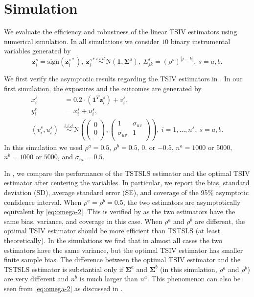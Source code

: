 \documentclass[preprint]{imsart}
\begin{document}
\section{Simulation}
\label{sec:simulation}

We evaluate the efficiency and robustness of the linear TSIV
estimators using numerical simulation. In all simulations we consider
$10$ binary instrumental variables generated by
\begin{equation} \label{eq:sim-iv}
  \mathbf{z}_i^s = \mathrm{sign}(\mathbf{z}_i^{s*}),~\mathbf{z}_i^{s*}
  \overset{i.i.d.}{\sim} \mathrm{N}(\mathbf{1},
  \bm{\Sigma}^s),~\Sigma_{jk}^s = (\rho^s)^{|j-k|},~s=a,b.
\end{equation}

We first verify the asymptotic results regarding the TSIV estimators in
. In our first simulation, the exposures
and the outcomes
are generated by
\begin{align}
  x_i^s &= 0.2 \cdot (\mathbf{1}^T \mathbf{z}_i^s) +
  v_i^s, \label{eq:sim1-exposure} \\
  y_i^s &= x_i^s + u_i^s, \label{eq:sim1-outcome}\\
  (v_i^s,u_i^s) &\overset{i.i.d.}{\sim} \mathrm{N}\left(
    \begin{pmatrix}
      0 \\
      0 \\
    \end{pmatrix},
    \begin{pmatrix}
      1 & \sigma_{uv} \\
      \sigma_{uv} & 1 \\
    \end{pmatrix}
  \right),~i=1,\dotsc,n^s,~s=a,b. \label{eq:sim1-uv}
\end{align}
In this simulation we used $\rho^a = 0.5$, $\rho^b = 0.5$, $0$, or
$-0.5$, $n^a=1000$ or $5000$, $n^b = 1000$ or $5000$, and $\sigma_{uv}
= 0.5$.

In , we compare the performance of the TSTSLS
estimator and the optimal TSIV estimator after centering the
variables. In particular, we report
the bias, standard deviation (SD), average standard error (SE), and coverage of the 95\%
asymptotic confidence interval. When $\rho^a = \rho^b = 0.5$, the two
estimators are asymptotically equivalent by \eqref{eq:omega-2}. This
is verified by  as the two estimators have the same
bias, variance, and coverage in this case. When $\rho^a$ and $\rho^b$ are
different, the optimal TSIV estimator should be more efficient
than TSTSLS (at least theoretically). In the simulations we find that
in almost all cases the two estimators have the same variance, but the
optimal TSIV estimator has smaller finite sample bias.
The difference between the optimal TSIV estimator and the TSTSLS
estimator is
substantial only if $\bm{\Sigma}^a$ and $\bm{\Sigma}^b$ (in this
simulation, $\rho^a$ and $\rho^b$) are very different and $n^b$ is
much larger than $n^a$. This phenomenon can also be seen from
\eqref{eq:omega-2} as discussed in .
\end{document}

